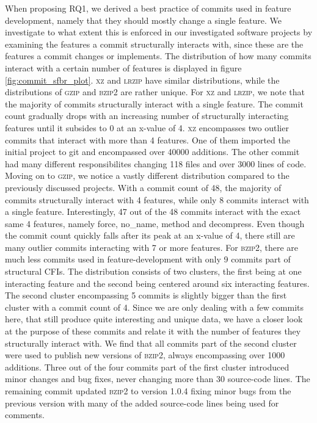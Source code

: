 When proposing RQ1, we derived a best practice of commits used in feature development, namely that they should mostly change a single feature.
We investigate to what extent this is enforced in our investigated software projects by examining the features a commit structurally interacts with, since these are the features a commit changes or implements.
The distribution of how many commits interact with a certain number of features is displayed in figure \ref{fig:commit_sfbr_plot}.
\textsc{xz} and \textsc{lrzip} have similar distributions, while the distributions of \textsc{gzip} and \textsc{bzip2} are rather unique.
For \textsc{xz} and \textsc{lrzip}, we note that the majority of commits structurally interact with a single feature.
The commit count gradually drops with an increasing number of structurally interacting features until it subsides to 0 at an x-value of 4.
\textsc{xz} encompasses two outlier commits that interact with more than 4 features. 
One of them imported the initial project to git and encompassed over 40000 additions.
The other commit had many different responsibilites changing 118 files and over 3000 lines of code.
Moving on to \textsc{gzip}, we notice a vastly different distribution compared to the previously discussed projects.
With a commit count of 48, the majority of commits structurally interact with 4 features, while only 8 commits interact with a single feature.
Interestingly, 47 out of the 48 commits interact with the exact same 4 features, namely \textsf{force}, \textsf{no\_name}, \textsf{method} and \textsf{decompress}.
Even though the commit count quickly falls after its peak at an x-value of 4, there still are many outlier commits interacting with 7 or more features.
For \textsc{bzip2}, there are much less commits used in feature-development with only 9 commits part of structural CFIs.
The distribution consists of two clusters, the first being at one interacting feature and the second being centered around six interacting features.
The second cluster encompassing 5 commits is slightly bigger than the first cluster with a commit count of 4.
Since we are only dealing with a few commits here, that still produce quite interesting and unique data, we have a closer look at the purpose of these commits and relate it with the number of features they structurally interact with.
We find that all commits part of the second cluster were used to publish new versions of \textsc{bzip2}, always encompassing over 1000 additions.
Three out of the four commits part of the first cluster introduced minor changes and bug fixes, never changing more than 30 source-code lines.
The remaining commit updated \textsc{bzip2} to version 1.0.4 fixing minor bugs from the previous version with many of the added source-code lines being used for comments. 

